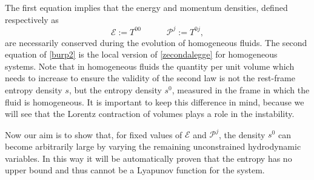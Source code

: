 \documentclass[a4paper, amsfonts, amssymb, amsmath, reprint, showkeys, nofootinbib, twoside]{revtex4-1}
\newcommand{\spc}{\quad \quad \quad}
\begin{document}
The first equation implies that the energy and momentum densities, defined respectively as
\begin{equation}\label{CCCooonnn}
\mathcal{E} := T^{00}  \spc  \mathcal{P}^j := T^{0j},
\end{equation}
are necessarily conserved during the evolution of homogeneous fluids. The second equation of \eqref{burp2} is the local version of \eqref{zecondalegge} for homogeneous systems. Note that in homogeneous fluids the quantity per unit volume which needs to increase to ensure the validity of the second law is not the rest-frame entropy density $s$, but the entropy density $s^0$, measured in the frame in which the fluid is homogeneous. It is important to keep this difference in mind, because we will see that the Lorentz contraction of volumes plays a role in the instability.


Now our aim is to show that, for fixed values of $\mathcal{E}$ and $\mathcal{P}^j$, the density $s^0$ can become arbitrarily large by varying the remaining unconstrained hydrodynamic variables. In this way it will be automatically proven that the entropy has no upper bound and thus cannot be a Lyapunov function for the system. 
\end{document}
